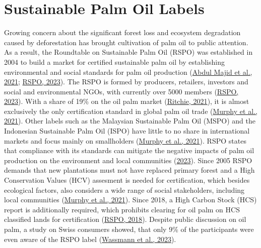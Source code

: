 \documentclass[
  letterpaper,
  DIV=11,
  numbers=noendperiod]{scrreprt}
\begin{document}
\hypertarget{sustainable-palm-oil-labels}{%
\section{Sustainable Palm Oil
Labels}\label{sustainable-palm-oil-labels}}

Growing concern about the significant forest loss and ecosystem
degradation caused by deforestation has brought cultivation of palm oil
to public attention. As a result, the Roundtable on Sustainable Palm Oil
(RSPO) was established in 2004 to build a market for certified
sustainable palm oil by establishing environmental and social standards
for palm oil production
(\protect\hyperlink{ref-abdulmajidSustainablePalmOil2021}{Abdul Majid et
al., 2021}; \protect\hyperlink{ref-rspoWhoWeAre2023}{RSPO, 2023}). The
RSPO is formed by producers, retailers, investors and social and
environmental NGOs, with currently over 5000 members
(\protect\hyperlink{ref-rspoWhoWeAre2023}{RSPO, 2023}). With a share of
19\% on the oil palm market
(\protect\hyperlink{ref-ritchiePalmOil2021}{Ritchie, 2021}), it is
almost exclusively the only certification standard in global palm oil
trade (\protect\hyperlink{ref-murphyOilPalm2020s2021}{Murphy et al.,
2021}). Other labels such as the Malaysian Sustainable Palm Oil (MSPO)
and the Indonesian Sustainable Palm Oil (ISPO) have little to no share
in international markets and focus mainly on smallholders
(\protect\hyperlink{ref-murphyOilPalm2020s2021}{Murphy et al., 2021}).
RSPO states that compliance with its standards can mitigate the negative
impacts of palm oil production on the environment and local communities
(\protect\hyperlink{ref-rspoWhoWeAre2023}{2023}). Since 2005 RSPO
demands that new plantations must not have replaced primary forest and a
High Conservation Values (HCV) assesment is needed for certification,
which besides ecological factors, also considers a wide range of social
stakeholders, including local communities
(\protect\hyperlink{ref-murphyOilPalm2020s2021}{Murphy et al., 2021}).
Since 2018, a High Carbon Stock (HCS) report is additionally required,
which prohibits clearing for oil palm on HCS classified lands for
certification
(\protect\hyperlink{ref-rspoRSPOPrinciplesCriteria2018}{RSPO, 2018}).
Despite public discussion on oil palm, a study on Swiss consumers
showed, that only 9\% of the participants were even aware of the RSPO
label (\protect\hyperlink{ref-wassmannPalmOilRoundtable2023}{Wassmann et
al., 2023}).
\end{document}
